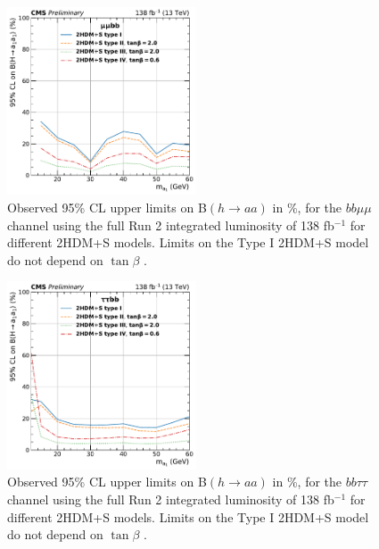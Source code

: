 \begin{figure}[ht]
    \begin{center}
      \includegraphics[width=0.5\textwidth]{figures/ch-10-results/HAA_bbmm_all_prelim.pdf}
    \end{center}
    \caption[Observed 95\% CL upper limits on B$(h \rightarrow aa)$ in \%, for the $bb\mu\mu$ channel using the full Run 2 integrated luminosity of 138 fb$^{-1}$ for different 2HDM+S models.]{Observed 95\% CL upper limits on B$(h \rightarrow aa)$ in \%, for the $bb\mu\mu$ channel using the full Run 2 integrated luminosity of 138 fb$^{-1}$ for different 2HDM+S models. Limits on the Type I 2HDM+S model do not depend on $\tan\beta$ \cite{CMS-AN-20-213}.}
      \label{fig:results_limits_mmbb}
  \end{figure}
  \begin{figure}[h!]
    \begin{center}
      \includegraphics[width=0.5\textwidth]{figures/ch-10-results/HAA_bbtt_all_prelim.pdf}
    \end{center}
    \caption[Observed 95\% CL upper limits on B$(h \rightarrow aa)$ in \%, for the $bb\tau\tau$ channel using the full Run 2 integrated luminosity of 138 fb$^{-1}$ for different 2HDM+S models.]{Observed 95\% CL upper limits on B$(h \rightarrow aa)$ in \%, for the $bb\tau\tau$ channel using the full Run 2 integrated luminosity of 138 fb$^{-1}$ for different 2HDM+S models. Limits on the Type I 2HDM+S model do not depend on $\tan\beta$ \cite{CMS-AN-20-213}.}
      \label{fig:results_limits_ttbb}
  \end{figure}
